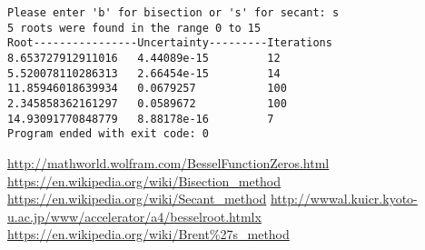 \documentclass{article}
\begin{document}
\begin{verbatim}
Please enter 'b' for bisection or 's' for secant: s
5 roots were found in the range 0 to 15
Root----------------Uncertainty---------Iterations
8.653727912911016   4.44089e-15         12                  
5.520078110286313   2.66454e-15         14                  
11.85946018639934   0.0679257           100                 
2.345858362161297   0.0589672           100                 
14.93091770848779   8.88178e-16         7                   
Program ended with exit code: 0

\end{verbatim}



\begin{thebibliography}{9}
\url{http://mathworld.wolfram.com/BesselFunctionZeros.html}
\url{https://en.wikipedia.org/wiki/Bisection_method}
\url{https://en.wikipedia.org/wiki/Secant_method}
\url{http://wwwal.kuicr.kyoto-u.ac.jp/www/accelerator/a4/besselroot.htmlx}
\url{https://en.wikipedia.org/wiki/Brent\%27s_method}
\end{thebibliography}
\end{document}
